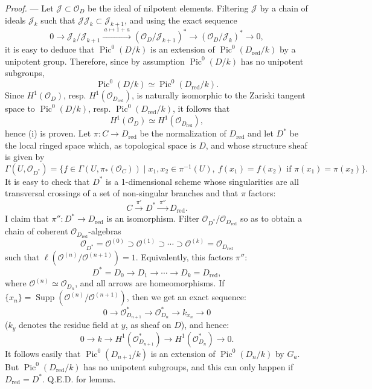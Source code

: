 \documentclass[10pt]{article}
\newcommand{\Pic}{\operatorname{Pic}}
\newcommand{\cO}{\mathcal O}
\begin{document}
\noindent\emph{Proof.} --- Let $\mathcal J\subset \cO_D$ be the ideal of nilpotent elements. Filtering $\mathcal J$ by a chain of ideals $\mathcal J_k$ such that $\mathcal J\mathcal J_k\subset\mathcal J_{k+1}$, and using the exact sequence
\[
0\longrightarrow \mathcal J_k/\mathcal J_{k+1}
\xrightarrow{\ a\mapsto 1+a\ }
(\cO_D/\mathcal J_{k+1})^*\longrightarrow (\cO_D/\mathcal J_k)^*\longrightarrow 0,
\]
it is easy to deduce that $\Pic^0(D/k)$ is an extension of $\Pic^0(D_{\mathrm{red}}/k)$ by a unipotent group. Therefore, since by assumption $\Pic^0(D/k)$ has no unipotent subgroups,
\[
\Pic^0(D/k)\simeq\Pic^0(D_{\mathrm{red}}/k).
\]
Since $H^1(\cO_D)$, resp. $H^1(\cO_{D_{\mathrm{red}}})$, is naturally isomorphic to the Zariski tangent space to $\Pic^0(D/k)$, resp. $\Pic^0(D_{\mathrm{red}}/k)$, it follows that
\[
H^1(\cO_D)\simeq H^1(\cO_{D_{\mathrm{red}}}),
\]
hence (i) is proven. Let $\pi:C\to D_{\mathrm{red}}$ be the normalization of $D_{\mathrm{red}}$ and let $D^*$ be the local ringed space which, as topological space is $D$, and whose structure sheaf is given by
\[
\Gamma(U,\cO_{D^*})=
\{f\in\Gamma(U,\pi_*(\cO_C))\mid x_1,x_2\in\pi^{-1}(U),\ f(x_1)=f(x_2)\text{ if }\pi(x_1)=\pi(x_2)\}.
\]
It is easy to check that $D^*$ is a 1-dimensional scheme whose singularities are all transversal crossings of a set of non-singular branches and that $\pi$ factors:
\[
C\xrightarrow{\ \pi'\ }D^*\xrightarrow{\ \pi''\ }D_{\mathrm{red}}.
\]
I claim that $\pi'':D^*\to D_{\mathrm{red}}$ is an isomorphism. Filter $\cO_{D^*}/\cO_{D_{\mathrm{red}}}$ so as to obtain a chain of coherent $\cO_{D_{\mathrm{red}}}$-algebras
\[
\cO_{D^*}=\cO^{(0)}\supset \cO^{(1)}\supset\cdots\supset \cO^{(k)}=\cO_{D_{\mathrm{red}}}
\]
such that $\ell(\cO^{(n)}/\cO^{(n+1)})=1$. Equivalently, this factors $\pi''$:
\[
D^*=D_0\longrightarrow D_1\longrightarrow\cdots\longrightarrow D_k=D_{\mathrm{red}},
\]
where $\cO^{(n)}\simeq\cO_{D_n}$, and all arrows are homeomorphisms. If $\{x_n\}=\operatorname{Supp}(\cO^{(n)}/\cO^{(n+1)})$, then we get an exact sequence:
\[
0\longrightarrow \cO_{D_{n+1}}^*\longrightarrow \cO_{D_n}^*\longrightarrow k_{x_n}\longrightarrow 0
\]
($k_y$ denotes the residue field at $y$, as sheaf on $D$), and hence:
\[
0\longrightarrow k\longrightarrow H^1(\cO_{D_{n+1}}^*)\longrightarrow H^1(\cO_{D_n}^*)\longrightarrow 0.
\]
It follows easily that $\Pic^0(D_{n+1}/k)$ is an extension of $\Pic^0(D_n/k)$ by $G_a$. But $\Pic^0(D_{\mathrm{red}}/k)$ has no unipotent subgroups, and this can only happen if $D_{\mathrm{red}}=D^*$. Q.E.D. for lemma.
\end{document}
